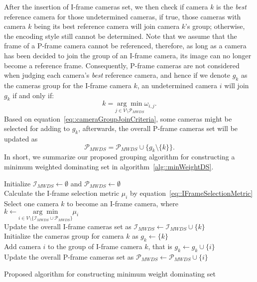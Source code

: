 After the insertion of I-frame cameras set, we then check if camera $k$ is the \emph{best} reference camera for those undetermined cameras, if true, those cameras with camera $k$ being its best reference camera will join camera $k$'s group; otherwise, the encoding style still cannot be determined.
Note that we assume that the frame of a P-frame camera cannot be referenced, therefore, as long as a camera has been decided to join the group of an I-frame camera, its image can no longer become a reference frame.
Consequently, P-frame cameras are not considered when judging each camera's \emph{best} reference camera, and hence if we denote $g_k$ as the cameras group for the I-frame camera $k$, an undetermined camera $i$ will join $g_k$ if and only if:
\begin{equation}
k = \underset{j \in V \setminus \mathcal{P}_{MWDS}}{\arg \min} \omega_{i,j}.
\label{eq::cameraGroupJoinCriteria}
\end{equation}
Based on equation~\eqref{eq::cameraGroupJoinCriteria}, some cameras might be selected for adding to $g_k$, afterwards, the overall P-frame cameras set will be updated as
\begin{equation}
\mathcal{P}_{MWDS} = \mathcal{P}_{MWDS} \cup \{ g_k \setminus \{k\} \}.
\label{eq::updatePCamsSet}
\end{equation}
In short, we summarize our proposed grouping algorithm for constructing a minimum weighted dominating set in algorithm~\ref{alg::minWeightDS}.
%
\IncMargin{1em}
\begin{algorithm}[]
 \SetAlgoLined
 \BlankLine
 Initialize $\mathcal{I}_{MWDS} \gets \emptyset$ and $\mathcal{P}_{MWDS} \gets \emptyset$ \\
 {
 	{
 		Calculate the I-frame selection metric $\mu_i$ by equation~\eqref{eq::IFrameSelectionMetric} \\
 	}
 	Select one camera $k$ to become an I-frame camera, where $k \gets \underset{i \in V \setminus \{ \mathcal{I}_{MWDS} \cup \mathcal{P}_{MWDS} \} }{\arg \min} \mu_i$ \\
 	Update the overall I-frame cameras set as $\mathcal{I}_{MWDS} \gets \mathcal{I}_{MWDS} \cup \{ k \}$ \\
 	Initialize the cameras group for camera $k$ as $g_k \gets \{ k \}$ \\
 	{
 		{
 			Add camera $i$ to the group of I-frame camera $k$, that is $g_k \gets g_k \cup \{ i \}$ \\
 			Update the overall P-frame cameras set as $\mathcal{P}_{MWDS} \gets \mathcal{P}_{MWDS} \cup \{ i \}$ \\
 		}
 	}
 }
 \caption{\label{alg::minWeightDS}Proposed algorithm for constructing minimum weight dominating set}
\end{algorithm}
